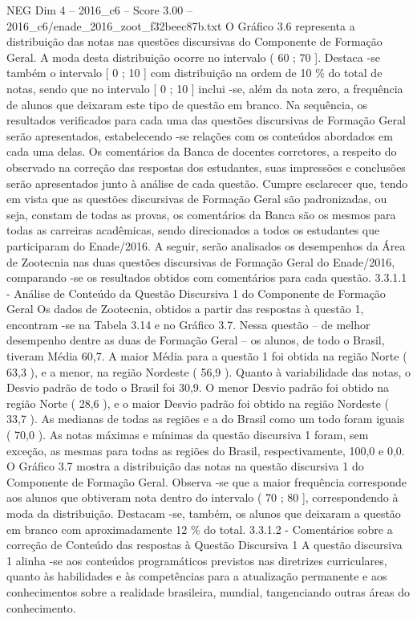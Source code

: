 \begin{textsample}{NEG Dim 4 – 2016\_c6 – Score 3.00 – 2016\_c6/enade\_2016\_zoot\_f32beec87b.txt}
O Gráfico 3.6 representa a distribuição das notas nas questões discursivas do Componente de Formação Geral.
A moda desta distribuição ocorre no intervalo ( 60 ; 70 ].
Destaca -se também o intervalo [ 0 ; 10 ] com distribuição na ordem de 10 \% do total de notas, sendo que no intervalo [ 0 ; 10 ] inclui -se, além da nota zero, a frequência de alunos que deixaram este tipo de questão em branco.
Na sequência, os resultados verificados para cada uma das questões discursivas de Formação Geral serão apresentados, estabelecendo -se relações com os conteúdos abordados em cada uma delas.
Os comentários da Banca de docentes corretores, a respeito do observado na correção das respostas dos estudantes, suas impressões e conclusões serão apresentados junto à análise de cada questão.
Cumpre esclarecer que, tendo em vista que as questões discursivas de Formação Geral são padronizadas, ou seja, constam de todas as provas, os comentários da Banca são os mesmos para todas as carreiras acadêmicas, sendo direcionados a todos os estudantes que participaram do Enade/2016.
A seguir, serão analisados os desempenhos da Área de Zootecnia nas duas questões discursivas de Formação Geral do Enade/2016, comparando -se os resultados obtidos com comentários para cada questão. 3.3.1.1 - Análise de Conteúdo da Questão Discursiva 1 do Componente de Formação Geral Os dados de Zootecnia, obtidos a partir das respostas à questão 1, encontram -se na Tabela 3.14 e no Gráfico 3.7.
Nessa questão – de melhor desempenho dentre as duas de Formação Geral – os alunos, de todo o Brasil, tiveram Média 60,7.
A maior Média para a questão 1 foi obtida na região Norte ( 63,3 ), e a menor, na região Nordeste ( 56,9 ).
Quanto à variabilidade das notas, o Desvio padrão de todo o Brasil foi 30,9.
O menor Desvio padrão foi obtido na região Norte ( 28,6 ), e o maior Desvio padrão foi obtido na região Nordeste ( 33,7 ).
As medianas de todas as regiões e a do Brasil como um todo foram iguais ( 70,0 ).
As notas máximas e mínimas da questão discursiva 1 foram, sem exceção, as mesmas para todas as regiões do Brasil, respectivamente, 100,0 e 0,0.
O Gráfico 3.7 mostra a distribuição das notas na questão discursiva 1 do Componente de Formação Geral.
Observa -se que a maior frequência corresponde aos alunos que obtiveram nota dentro do intervalo ( 70 ; 80 ], correspondendo à moda da distribuição.
Destacam -se, também, os alunos que deixaram a questão em branco com aproximadamente 12 \% do total. 3.3.1.2 - Comentários sobre a correção de Conteúdo das respostas à Questão Discursiva 1 A questão discursiva 1 alinha -se aos conteúdos programáticos previstos nas diretrizes curriculares, quanto às habilidades e às competências para a atualização permanente e aos conhecimentos sobre a realidade brasileira, mundial, tangenciando outras áreas do conhecimento.

\end{textsample}
